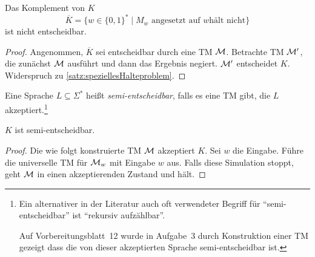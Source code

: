 \begin{Korollar}[name={[Komplement des speziellen Halteproblems ist unentscheidbar]}]\label{kor:6.11_alt}
	Das Komplement von $K$
	$$\overline{K} = \{w \in\{0,1\}^* \mid M_w\text{ angesetzt auf }w\text{
		hält nicht} \}$$
	ist nicht entscheidbar.
\end{Korollar}


\begin{proof}
	Angenommen, $\overline{K}$ sei entscheidbar durch eine \ac{TM} $\mathcal{M}$.
	Betrachte \ac{TM} $\mathcal{M}'$, die zunächst $\mathcal{M}$ ausführt und dann das Ergebnis negiert.
	$\mathcal{M}'$ entscheidet $K$.
	Widerspruch zu \autoref{satz:speziellesHalteproblem}.
\end{proof}


\begin{Def}[name={[Semi-Entscheidbarkeit]}]\label{def:semiEntscheidbar}
	Eine Sprache $L\subseteq\Sigma^*$ heißt \emph{semi-entscheidbar}, falls es eine \ac{TM} gibt, die $L$ akzeptiert.\footnote{
		Ein alternativer in der Literatur auch oft verwendeter Begriff für "`semi-entscheidbar"' ist "`rekursiv aufzählbar"'.
	
		Auf Vorbereitungsblatt~12 wurde in Aufgabe~3 durch Konstruktion einer \ac{TM} gezeigt dass die von dieser akzeptierten Sprache semi-entscheidbar ist.
	}
\end{Def}


\begin{lemma}[name={[spezielles Halteproblems ist semi-entscheidbar]}]\label{lemma:Ksemi-entscheidbar}
	$K$ ist semi-entscheidbar.
\end{lemma}


\begin{proof}
	Die wie folgt konstruierte \ac{TM} $\mathcal{M}$ akzeptiert $K$.
	Sei $w$ die Eingabe. 
	Führe die universelle \ac{TM} für $\mathcal{M}_w$ mit Eingabe $w$ aus.
	Falls diese Simulation stoppt, geht $\mathcal{M}$ in einen akzeptierenden Zustand und hält.
\end{proof}


